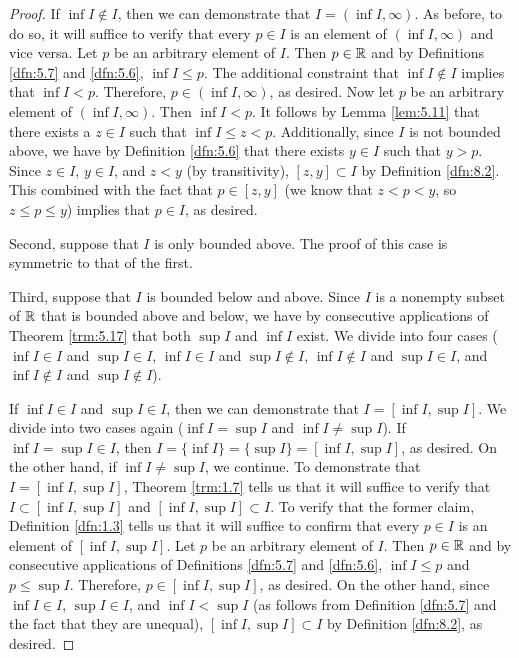 \documentclass[../main.tex]{subfiles}
\begin{document}
\begin{lemma}
\begin{proof}
        If $\inf I\notin I$, then we can demonstrate that $I=(\inf I,\infty)$. As before, to do so, it will suffice to verify that every $p\in I$ is an element of $(\inf I,\infty)$ and vice versa. Let $p$ be an arbitrary element of $I$. Then $p\in\mathbb{R}$ and by Definitions \ref{dfn:5.7} and \ref{dfn:5.6}, $\inf I\leq p$. The additional constraint that $\inf I\notin I$ implies that $\inf I<p$. Therefore, $p\in(\inf I,\infty)$, as desired. Now let $p$ be an arbitrary element of $(\inf I,\infty)$. Then $\inf I<p$. It follows by Lemma \ref{lem:5.11} that there exists a $z\in I$ such that $\inf I\leq z<p$. Additionally, since $I$ is not bounded above, we have by Definition \ref{dfn:5.6} that there exists $y\in I$ such that $y>p$. Since $z\in I$, $y\in I$, and $z<y$ (by transitivity), $[z,y]\subset I$ by Definition \ref{dfn:8.2}. This combined with the fact that $p\in[z,y]$ (we know that $z<p<y$, so $z\leq p\leq y$) implies that $p\in I$, as desired.\par\smallskip
        Second, suppose that $I$ is only bounded above. The proof of this case is symmetric to that of the first.\par\smallskip
        Third, suppose that $I$ is bounded below and above. Since $I$ is a nonempty subset of $\mathbb{R}$ that is bounded above and below, we have by consecutive applications of Theorem \ref{trm:5.17} that both $\sup I$ and $\inf I$ exist. We divide into four cases ($\inf I\in I$ and $\sup I\in I$, $\inf I\in I$ and $\sup I\notin I$, $\inf I\notin I$ and $\sup I\in I$, and $\inf I\notin I$ and $\sup I\notin I$).\par
        If $\inf I\in I$ and $\sup I\in I$, then we can demonstrate that $I=[\inf I,\sup I]$. We divide into two cases again ($\inf I=\sup I$ and $\inf I\neq\sup I$). If $\inf I=\sup I\in I$, then $I=\{\inf I\}=\{\sup I\}=[\inf I,\sup I]$, as desired. On the other hand, if $\inf I\neq\sup I$, we continue. To demonstrate that $I=[\inf I,\sup I]$, Theorem \ref{trm:1.7} tells us that it will suffice to verify that $I\subset[\inf I,\sup I]$ and $[\inf I,\sup I]\subset I$. To verify that the former claim, Definition \ref{dfn:1.3} tells us that it will suffice to confirm that every $p\in I$ is an element of $[\inf I,\sup I]$. Let $p$ be an arbitrary element of $I$. Then $p\in\mathbb{R}$ and by consecutive applications of Definitions \ref{dfn:5.7} and \ref{dfn:5.6}, $\inf I\leq p$ and $p\leq\sup I$. Therefore, $p\in[\inf I,\sup I]$, as desired. On the other hand, since $\inf I\in I$, $\sup I\in I$, and $\inf I<\sup I$ (as follows from Definition \ref{dfn:5.7} and the fact that they are unequal), $[\inf I,\sup I]\subset I$ by Definition \ref{dfn:8.2}, as desired.\par

\end{proof}
\end{lemma}
\end{document}
